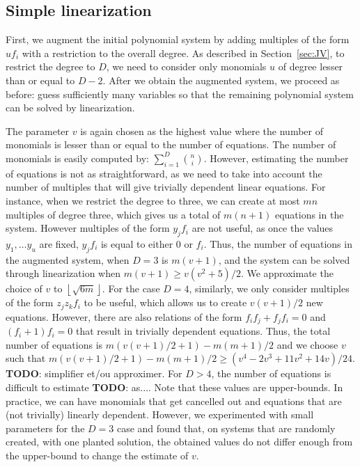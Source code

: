 \documentclass[a4paper,UKenglish,cleveref, autoref]{lipics-v2019}
\newcommand{\red}{\color{red}}
\newcommand{\TODO}[1]{{\red \textbf{TODO}:} #1\xspace}
\begin{document}
\subsection{Simple linearization}

First, we augment the initial polynomial system by adding multiples of the form $uf_i$ with a restriction to the overall degree. As described in Section~\ref{sec:JV}, to restrict the degree to $D$, we need to consider only monomials $u$ of degree lesser than or equal to $D-2$. After we obtain the augmented system, we proceed as before: guess sufficiently many variables so that the remaining polynomial system can be solved by linearization. 

The parameter $v$ is again chosen as the highest value where the number of monomials is lesser than or equal to the number of equations. The number of monomials is easily computed by: $\sum_{i=1}^{D}\binom{n}{i}$. However, estimating the number of equations is not as straightforward, as we need to take into account the number of multiples that will give trivially dependent linear equations. For instance, when we restrict the degree to three, we can create at most $mn$ multiples of degree three, which gives us a total of $m(n+1)$ equations in the system. However multiples of the form $y_jf_i$ are not useful, as once the values $y_1,\dots y_u$ are fixed, $y_jf_i$ is equal to either 0 or $f_i$. Thus, the number of equations in the augmented system, when $D=3$ is $m(v+1)$, and the system can be solved through linearization when $m(v+1) \geq v(v^2+5)/2$. We approximate the choice of $v$ to $\left\lfloor \sqrt{6m} \right\rfloor$. For the case $D=4$, similarly, we only consider multiples of the form $z_jz_kf_i$ to be useful, which allows us to create $v(v+1)/2$ new equations. However, there are also relations of the form $f_if_j + f_jf_i=0$ and $(f_i+1)f_i=0$ that result in trivially dependent equations. Thus, the total number of equations is $m(v(v+1)/2+1)-m(m+1)/2$ and we choose $v$ such that $m(v(v+1)/2+1)-m(m+1)/2 \geq (v^4-2v^3+11v^2+14v)/24$. \TODO{simplifier et/ou approximer}. For $D > 4$, the number of equations is difficult to estimate \TODO{as...}. Note that these values are upper-bounds. In practice, we can have monomials that get cancelled out and equations that are (not trivially) linearly dependent. However, we experimented with small parameters for the $D=3$ case and found that, on systems that are randomly created, with one planted solution, the obtained values do not differ enough from the upper-bound to change the estimate of $v$. 
\end{document}
